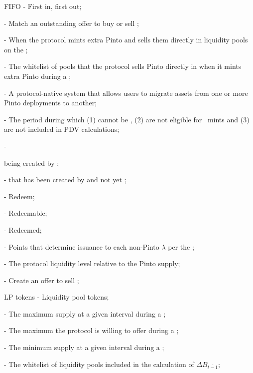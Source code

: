 \documentclass[class=article, crop=false]{standalone}
\begin{document}
\begin{itemize}[topsep=0pt, itemsep=3pt,leftmargin=16pt]
    \item[] FIFO - First in, first out;
    \item[]  - Match an outstanding offer to buy or sell ;
    \item[]  - When the protocol mints extra Pinto and sells them directly in liquidity pools on the ;
    \item[]  - The whitelist of pools that the protocol sells Pinto directly in when it mints extra Pinto during a ;
    \item[]  - A protocol-native system that allows users to migrate assets from one or more Pinto deployments to another;
    \item[]  - The period during which  (1) cannot be , (2) are not eligible for \Pinto\ mints and (3) are not included in  PDV calculations;
    \item[]  - { being created by ;
    \item[]  -  that has been created by  and not yet ;
    \item[]  - Redeem;
    \item[]  - Redeemable;
    \item[]  - Redeemed;
    \item[]  - Points that determine  issuance to each non-Pinto $\lambda$ per the ;
    \item[]  - The protocol liquidity level relative to the Pinto supply;
    \item[]  - Create an offer to sell ;
    \item[] LP tokens - Liquidity pool tokens;
    \item[]  - The maximum  supply at a given interval during a ;
    \item[]  - The maximum  the protocol is willing to offer during a ;
    \item[]  - The minimum  supply at a given interval during a ;
    \item[]  - The whitelist of liquidity pools included in the calculation of $\Delta B_{\overline{t-1}}$;
}
\end{itemize}
\end{document}
